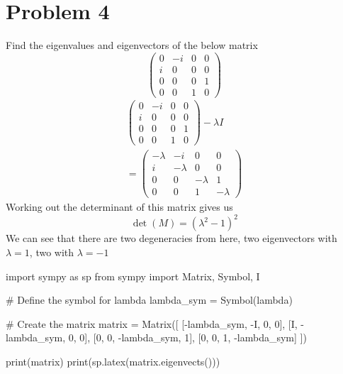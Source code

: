 \documentclass[]{article}
\newenvironment{Shaded}{\begin{snugshade}}{\end{snugshade}}
\newcommand{\NormalTok}[1]{#1}
\begin{document}
\hypertarget{problem-4}{%
\section{Problem 4}\label{problem-4}}

Find the eigenvalues and eigenvectors of the below matrix \[
\begin{pmatrix}
0 & -i & 0 & 0  \\
i & 0 & 0 & 0 \\
0 & 0 & 0 & 1 \\
0 & 0 & 1 & 0
\end{pmatrix}
\] \[
\begin{align}
\begin{pmatrix}
0 & -i & 0 & 0  \\
i & 0 & 0 & 0 \\
0 & 0 & 0 & 1 \\
0 & 0 & 1 & 0
\end{pmatrix}-\lambda I \\
=\begin{pmatrix}
-\lambda & -i & 0 & 0  \\
i & -\lambda & 0 & 0 \\
0 & 0 & -\lambda & 1 \\
0 & 0 & 1 & -\lambda
\end{pmatrix}
\end{align}
\] Working out the determinant of this matrix gives us \[
\det(M) = \left(\lambda^{2} - 1\right)^{2}
\] We can see that there are two degeneracies from here, two
eigenvectors with \(\lambda=1\), two with \(\lambda=-1\)

\begin{Shaded}
\begin{Highlighting}[]
\NormalTok{import sympy as sp}
\NormalTok{from sympy import Matrix, Symbol, I}

\NormalTok{\# Define the symbol for lambda}
\NormalTok{lambda\_sym = Symbol(\textquotesingle{}lambda\textquotesingle{})}

\NormalTok{\# Create the matrix}
\NormalTok{matrix = Matrix([}
\NormalTok{    [{-}lambda\_sym, {-}I, 0, 0],}
\NormalTok{    [I, {-}lambda\_sym, 0, 0],}
\NormalTok{    [0, 0, {-}lambda\_sym, 1],}
\NormalTok{    [0, 0, 1, {-}lambda\_sym]}
\NormalTok{])}

\NormalTok{print(matrix)}
\NormalTok{print(sp.latex(matrix.eigenvects()))}
\end{Highlighting}
\end{Shaded}
\end{document}
